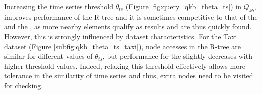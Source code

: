 Increasing the time series threshold $\theta_{ts}$ (Figure \ref{fig:query_qkb_theta_ts}) in $Q_{kb}$, improves performance of the R-tree and it is sometimes competitive to that of the \tsr and the \btsr, as more nearby elements qualify as results and are thus quickly found. However, this is strongly influenced by dataset characteristics. For the Taxi dataset (Figure \ref{subfig:qkb_theta_ts_taxi}), node accesses in the R-tree are similar for different values of $\theta_{ts}$, but performance for the \btsr slightly decreases with higher threshold values. Indeed, relaxing this threshold effectively allows more tolerance in the similarity of time series and thus, extra nodes need to be visited for checking.

\begin{figure}[!ht]
	\centering
	 \\

\end{figure}
